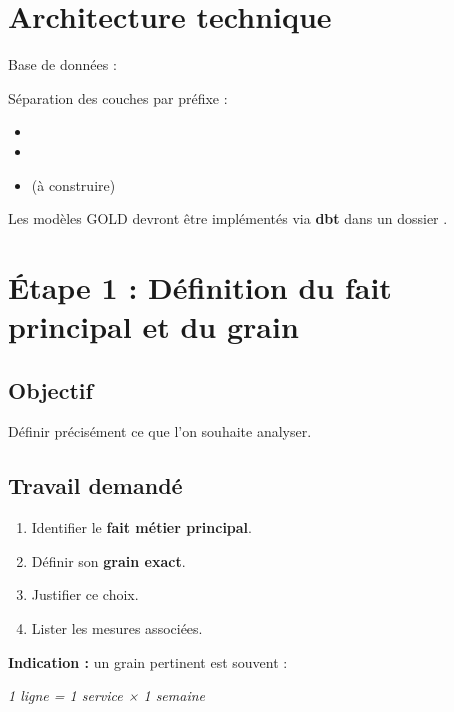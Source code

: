 \documentclass[11pt,a4paper]{article}
\begin{document}

\section*{Architecture technique}

Base de données : 

Séparation des couches par préfixe :

\begin{itemize}
  \item {}
  \item {}
  \item {} (à construire)
\end{itemize}

Les modèles GOLD devront être implémentés via \textbf{dbt}
dans un dossier .


\section{Étape 1 : Définition du fait principal et du grain}

\subsection*{Objectif}

Définir précisément ce que l’on souhaite analyser.

\subsection*{Travail demandé}

\begin{enumerate}
  \item Identifier le \textbf{fait métier principal}.
  \item Définir son \textbf{grain exact}.
  \item Justifier ce choix.
  \item Lister les mesures associées.
\end{enumerate}

\textbf{Indication :}
un grain pertinent est souvent :
\begin{center}
\textit{1 ligne = 1 service × 1 semaine}
\end{center}
\end{document}
